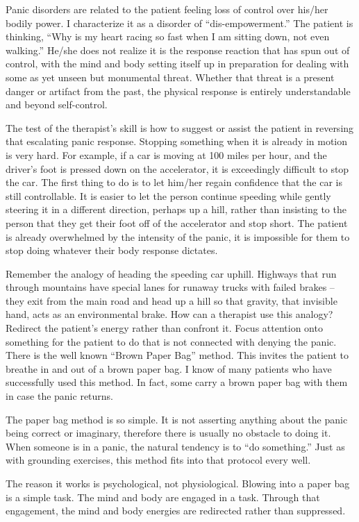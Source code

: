 \documentclass[]{book}
\begin{document}
Panic disorders are related to the patient feeling loss of control over his/her bodily power. I characterize it as a disorder of ``dis-empowerment.'' The patient is thinking, ``Why is my heart racing so fast when I am sitting down, not even walking.'' He/she does not realize it is the response reaction that has spun out of control, with the mind and body setting itself up in preparation for dealing with some as yet unseen but monumental threat. Whether that threat is a present danger or artifact from the past, the physical response is entirely understandable and beyond self-control.

The test of the therapist's skill is how to suggest or assist the patient in reversing that escalating panic response. Stopping something when it is already in motion is very hard. For example, if a car is moving at 100 miles per hour, and the driver's foot is pressed down on the accelerator, it is exceedingly difficult to stop the car. The first thing to do is to let him/her regain confidence that the car is still controllable. It is easier to let the person continue speeding while gently steering it in a different direction, perhaps up a hill, rather than insisting to the person that they get their foot off of the accelerator and stop short. The patient is already overwhelmed by the intensity of the panic, it is impossible for them to stop doing whatever their body response dictates.

Remember the analogy of heading the speeding car uphill. Highways that run through mountains have special lanes for runaway trucks with failed brakes -- they exit from the main road and head up a hill so that gravity, that invisible hand, acts as an environmental brake. How can a therapist use this analogy? Redirect the patient's energy rather than confront it. Focus attention onto something for the patient to do that is not connected with denying the panic. There is the well known ``Brown Paper Bag'' method. This invites the patient to breathe in and out of a brown paper bag. I know of many patients who have successfully used this method. In fact, some carry a brown paper bag with them in case the panic returns.

The paper bag method is so simple. It is not asserting anything about the panic being correct or imaginary, therefore there is usually no obstacle to doing it. When someone is in a panic, the natural tendency is to ``do something.'' Just as with grounding exercises, this method fits into that protocol every well.

The reason it works is psychological, not physiological. Blowing into a paper bag is a simple task. The mind and body are engaged in a task. Through that engagement, the mind and body energies are redirected rather than suppressed.
\end{document}
